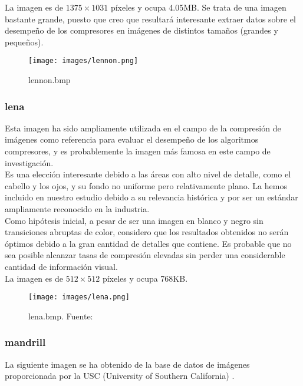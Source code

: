 \documentclass[12pt,a4paper]{article}
\begin{document}
La imagen es de $1375\times1031$ píxeles y ocupa 4.05MB. Se trata de una imagen bastante grande, puesto que creo que resultará interesante extraer datos sobre el desempeño de los compresores en imágenes de distintos tamaños (grandes y pequeños).\\

\begin{figure}[H]
    \centering
    \texttt{[image: images/lennon.png]}
    \caption{lennon.bmp}
    
\end{figure}

\break
\subsubsection{lena}
Esta imagen ha sido ampliamente utilizada en el campo de la compresión de imágenes como referencia para evaluar el desempeño de los algoritmos compresores, y es probablemente la imagen más famosa en este campo de investigación.\\ 

Es una elección interesante debido a las áreas con alto nivel de detalle, como el cabello y los ojos, y su fondo no uniforme pero relativamente plano. La hemos incluido en nuestro estudio debido a su relevancia histórica y por ser un estándar ampliamente reconocido en la industria.\\

Como hipótesis inicial, a pesar de ser una imagen en blanco y negro sin transiciones abruptas de color, considero que los resultados obtenidos no serán óptimos debido a la gran cantidad de detalles que contiene. Es probable que no sea posible alcanzar tasas de compresión elevadas sin perder una considerable cantidad de información visual.\\

La imagen es de $512\times512$ píxeles y ocupa 768KB.\\

\begin{figure}[H]
    \centering
    \texttt{[image: images/lena.png]}
    \caption{lena.bmp. Fuente:\cite{NYU-SampleData}}
    
\end{figure}

\break
\subsubsection{mandrill}
La siguiente imagen se ha obtenido de la base de datos de imágenes proporcionada por la USC (University of Southern California) \cite{USCSIPI-Database}.\\
\end{document}
